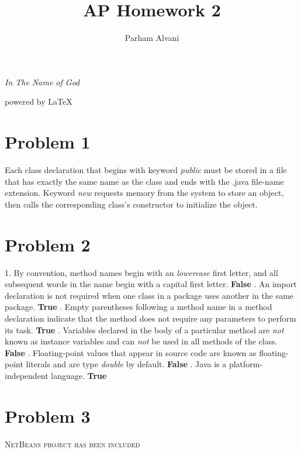 \documentclass[•]{article}
\author{Parham Alvani}
\title{AP Homework 2}
\begin{document}
\begin{titlepage}
	\begin{center}
		\emph{In The Name of God}
	\end{center}
	\maketitle
	\begin{center}
		powered by \LaTeX
	\end{center}
\end{titlepage}
\tableofcontents
\newpage
\section{Problem 1}
Each class declaration that begins with keyword \textit{public} must be stored in a file that
has exactly the same name as the class and ends with the .java file-name extension. 
\newline
Keyword \textit{new} requests memory from the system to store an object, then calls the
corresponding class's constructor to initialize the object. 
\section{Problem 2}
1. By convention, method names begin with an \textit{lowercase} first letter, and all subsequent
words in the name begin with a capital first letter. \textbf{False}
. An import declaration is not required when one class in a package uses another in the
same package. \textbf{True}
. Empty parentheses following a method name in a method declaration indicate that the
method does not require any parameters to perform its task. \textbf{True}
. Variables declared in the body of a particular method are \textit{not} known as instance variables 
and can \textit{not} be used in all methods of the class. \textbf{False}
. Floating-point values that appear in source code are known as floating-point literals and
are type \textit{double} by default. \textbf{False}
. Java is a platform-independent language. \textbf{True} 
\section{Problem 3}
\textsc{NetBeans project has been included} 
\end{document}
